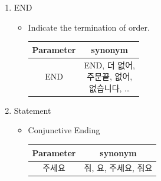 \documentclass[conference,compsoc]{IEEEtran}
\begin{document}
\begin{enumerate}
\begin{itemize}
  \end{itemize}

  \item END
  \begin{itemize}
    \item Indicate the termination of order.
    \begin{table}[ht!] \renewcommand\arraystretch{1.25}
      \centering
        \begin{tabular}{@{}c | c @{}}
        \hline
        Parameter & synonym \\ 
        \hline
        END & \makecell{END, 더 없어, \\ 주문끝, 없어, \\ 없습니다, …}	 \\ 
        \hline
        \end{tabular}
    \end{table} 

  \end{itemize}

  \item Statement
  \begin{itemize}
    \item Conjunctive Ending
    \begin{table}[ht!] \renewcommand\arraystretch{1.25}
      \centering
        \begin{tabular}{@{}c | c @{}}
        \hline
        Parameter & synonym \\ 
        \hline
        주세요 & 줘, 요, 주세요, 줘요	 \\ 
        \hline
        \end{tabular}
    \end{table} 

  \end{itemize}
\end{enumerate}
\end{document}
